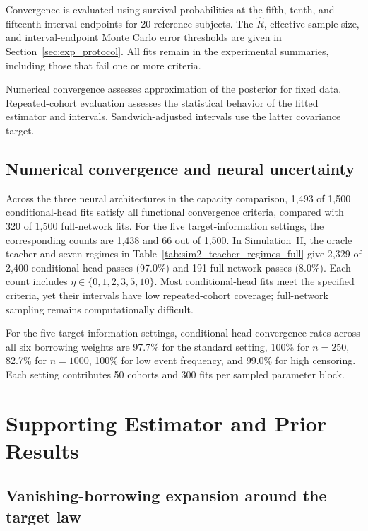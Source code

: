 \documentclass{article} %
\begin{document}
Convergence is evaluated using survival probabilities at the fifth, tenth, and fifteenth interval endpoints for 20 reference subjects. The $\widehat R$, effective sample size, and interval-endpoint Monte Carlo error thresholds are given in Section~\ref{sec:exp_protocol}. All fits remain in the experimental summaries, including those that fail one or more criteria.

Numerical convergence assesses approximation of the posterior for fixed data. Repeated-cohort evaluation assesses the statistical behavior of the fitted estimator and intervals. Sandwich-adjusted intervals use the latter covariance target.


\subsection{Numerical convergence and neural uncertainty}
\label{sec:numerical_audit_results}
\label{app:convergence-results}
Across the three neural architectures in the capacity comparison, 1,493 of 1,500 conditional-head fits satisfy all functional convergence criteria, compared with 320 of 1,500 full-network fits. For the five target-information settings, the corresponding counts are 1,438 and 66 out of 1,500. In Simulation~II, the oracle teacher and seven regimes in Table~\ref{tab:sim2_teacher_regimes_full} give 2,329 of 2,400 conditional-head passes (97.0\%) and 191 full-network passes (8.0\%). Each count includes $\eta\in\{0,1,2,3,5,10\}$. Most conditional-head fits meet the specified criteria, yet their intervals have low repeated-cohort coverage; full-network sampling remains computationally difficult.

For the five target-information settings, conditional-head convergence rates across all six borrowing weights are 97.7\% for the standard setting, 100\% for $n=250$, 82.7\% for $n=1000$, 100\% for low event frequency, and 99.0\% for high censoring. Each setting contributes 50 cohorts and 300 fits per sampled parameter block.

\section{Supporting Estimator and Prior Results}
\label{app:supporting-theory}
\subsection{Vanishing-borrowing expansion around the target law}
\label{app:vanishing-borrowing}
\end{document}
